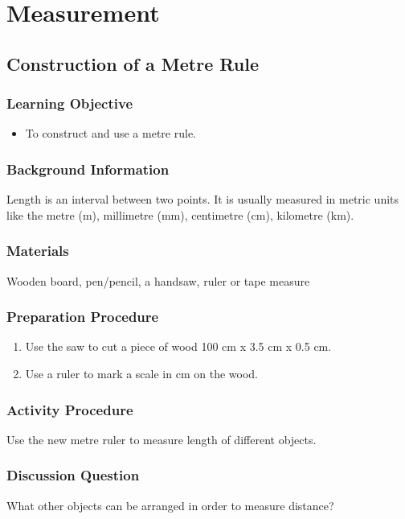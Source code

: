 \section{Measurement}	

\subsection{Construction of a Metre Rule}

\subsubsection*{Learning Objective}
\begin{itemize}
\item{To construct and use a metre rule.} 
\end{itemize}

\subsubsection*{Background Information}
Length is an interval between two points. It is usually measured in metric units like the metre (m), millimetre (mm), centimetre (cm), kilometre (km).

\subsubsection*{Materials}
Wooden board, pen/pencil, a handsaw, ruler or tape measure

\subsubsection*{Preparation Procedure}
\begin{enumerate}
\item{Use the saw to cut a piece of wood 100 cm x 3.5 cm x 0.5 cm.} 
\item{Use a ruler to mark a scale in cm on the wood.} 
\end{enumerate}

\subsubsection*{Activity Procedure}
Use the new metre ruler to measure length of different objects.

\subsubsection*{Discussion Question}
What other objects can be arranged in order to measure distance?

